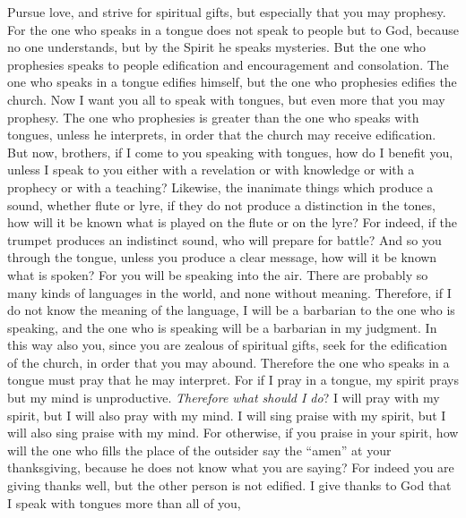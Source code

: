 \begin{biblechapter} %
 Pursue love, and strive for spiritual gifts, but especially that you may prophesy.
\verse For the one who speaks in a tongue does not speak to people but to God, because no one understands, but by the Spirit he speaks mysteries.
\verse But the one who prophesies speaks to people edification and encouragement and consolation.
\verse The one who speaks in a tongue edifies himself, but the one who prophesies edifies the church.
\verse Now I want you all to speak with tongues, but even more that you may prophesy. The one who prophesies is greater than the one who speaks with tongues, unless he interprets, in order that the church may receive edification.
\verse But now, brothers, if I come to you speaking with tongues, how do I benefit you, unless I speak to you either with a revelation or with knowledge or with a prophecy or with a teaching?
\verse Likewise, the inanimate things which produce a sound, whether flute or lyre, if they do not produce a distinction in the tones, how will it be known what is played on the flute or on the lyre?
\verse For indeed, if the trumpet produces an indistinct sound, who will prepare for battle?
\verse And so you through the tongue, unless you produce a clear message, how will it be known what is spoken? For you will be speaking into the air.
\verse There are probably so many kinds of languages in the world, and none without meaning.
\verse Therefore, if I do not know the meaning of the language, I will be a barbarian to the one who is speaking, and the one who is speaking will be a barbarian in my judgment.
\verse In this way also you, since you are zealous of spiritual gifts, seek for the edification of the church, in order that you may abound.
\verse Therefore the one who speaks in a tongue must pray that he may interpret.
\verse For if I pray in a tongue, my spirit prays but my mind is unproductive.
\verse \textit{Therefore what should I do}? I will pray with my spirit, but I will also pray with my mind. I will sing praise with my spirit, but I will also sing praise with my mind.
\verse For otherwise, if you praise in your spirit, how will the one who fills the place of the outsider say the “amen” at your thanksgiving, because he does not know what you are saying?
\verse For indeed you are giving thanks well, but the other person is not edified.
\verse I give thanks to God that I speak with tongues more than all of you,

\end{biblechapter}
